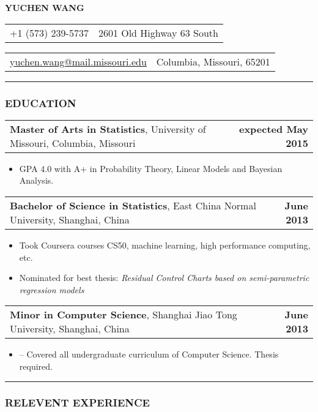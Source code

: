 \documentclass[11pt]{article}
\makeatletter
\newcommand{\headerrow}[2]
{\begin{tabular*}{\linewidth}{l@{\extracolsep{\fill}}r}
	#1 & #2 \\
\end{tabular*}
}
\makeatother
\begin{document}
\begin{center}
	\huge\textbf{YUCHEN WANG}
\end{center}

\noindent\headerrow{+1 (573) 239-5737}{2601 Old Highway 63 South}
\headerrow
{\href{mailto:yuchen.wang@mail.missouri.edu}{yuchen.wang@mail.missouri.edu}}
{Columbia, Missouri, 65201}

\vspace{-.8em}
\hrule

\subsubsection*{\centering EDUCATION}
\vspace{-.3em}

\headerrow
	{\textbf{Master of Arts in Statistics}, University of Missouri, Columbia, Missouri}
	{\textbf{expected May 2015}}
	\begin{itemize}
		\item GPA 4.0 with A+ in Probability Theory, Linear Models and Bayesian Analysis.
	\end{itemize}

\noindent\headerrow
	{\textbf{Bachelor of Science in Statistics}, East China Normal University, Shanghai, China}
	{\textbf{June 2013}}
	\begin{itemize}
		\item Took Coursera courses CS50, machine learning, high performance computing, etc.
		\item Nominated for best thesis: \textit{Residual Control Charts based on semi-parametric regression models}
	\end{itemize}

\noindent\headerrow
	{\textbf{Minor in Computer Science}, Shanghai Jiao Tong University, Shanghai, China}
	{\textbf{June 2013}}
	\begin{itemize}
		\item -- Covered all undergraduate curriculum of Computer Science. Thesis required.
	\end{itemize}

	\vspace{-.3em}
\vspace{0.2em}
\hrule


\subsubsection*{\centering RELEVENT EXPERIENCE}
\vspace{-.3em}
\end{document}
